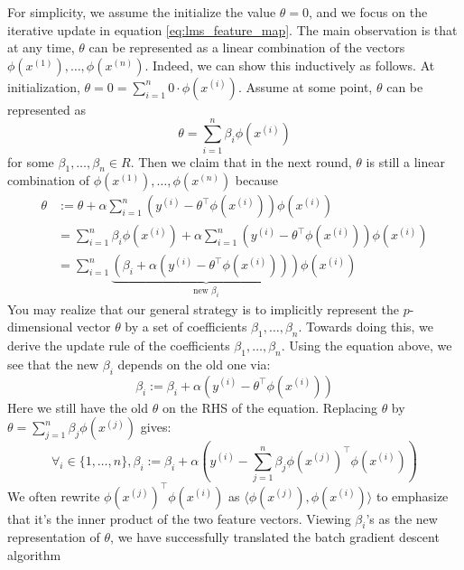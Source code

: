 For simplicity, we assume the initialize the value $\theta = 0$, and we focus
on the iterative update in equation \ref{eq:lms_feature_map}. %
The main observation is that at any time, $\theta$ can be represented
as a linear combination of the vectors $\phi(x^{(1)}),\ldots ,\phi(x^{(n)})$.
Indeed, we can show this inductively as follows. At initialization, $\theta = 0 = \sum_{i=1}^n 0 \cdot \phi(x^{(i)})$.
Assume at some point, $\theta$ can be represented as
\begin{equation}
    \theta = \sum_{i=1}^n \beta_i \phi(x^{(i)})
\end{equation}
for some $\beta_1 ,\ldots ,\beta_n \in R$. Then we claim that in the next round, $\theta$ is still a
linear combination of $\phi(x^{(1)}),\ldots ,\phi(x^{(n)})$ because
\begin{align}
    \theta &:= \theta + \alpha \sum_{i=1}^n \left( y^{(i)} - \theta^\top \phi(x^{(i)}) \right) \phi(x^{(i)})\\
           &= \sum_{i=1}^n \beta_i \phi(x^{(i)}) + \alpha \sum_{i=1}^n \left( y^{(i)} - \theta^\top \phi(x^{(i)}) \right) \phi(x^{(i)})\\
           &= \sum_{i=1}^n \underbrace{\left( \beta_i + \alpha \left( y^{(i)} - \theta^\top \phi(x^{(i)}) \right) \right)}_{\text{new $\beta_i$}} \phi(x^{(i)})
\end{align}
You may realize that our general strategy is to implicitly represent the $p$-dimensional
vector $\theta$ by a set of coefficients $\beta_1 ,\ldots ,\beta_n$. Towards doing this,
we derive the update rule of the coefficients $\beta_1 ,\ldots ,\beta_n$. Using the equation
above, we see that the new $\beta_i$ depends on the old one via: %
\begin{equation}
    \beta_i := \beta_i + \alpha \left( y^{(i)} - \theta^\top \phi(x^{(i)} ) \right)
\end{equation}
Here we still have the old $\theta$ on the RHS of the equation. Replacing $\theta$ by
$\theta = \sum_{j=1}^n \beta_j \phi(x^{(j)})$ gives: %
\begin{equation*}
    \forall_i \in \{1,\ldots,n\},\beta_i := \beta_i + \alpha \left( y^{(i)} - \sum_{j=1}^n \beta_j \phi(x^{(j)})^\top \phi(x^{(i)}) \right)
\end{equation*}
We often rewrite $\phi(x^{(j)})^\top \phi(x^{(i)} )$ as $\langle \phi(x^{(j)}), \phi(x^{(i)}) \rangle$ to emphasize that it's the
inner product of the two feature vectors. Viewing $\beta_i$'s as the new representation
of $\theta$, we have successfully translated the batch gradient descent algorithm
